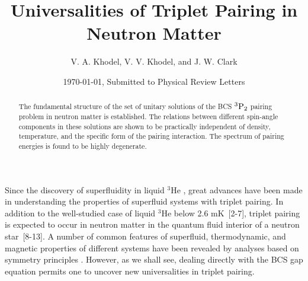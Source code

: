 

\draft
\title{Universalities of Triplet Pairing in Neutron Matter}
\author{V. A. Khodel, V. V. Khodel, and J. W. Clark}
\address{McDonnell Center for the Space Sciences
and Department of Physics,\\
Washington University, St. Louis, MO 63130 USA}
\date{\today , Submitted to Physical Review Letters}
\maketitle
\begin{abstract}

The fundamental structure of the set of unitary solutions of
the BCS $^3{\rm P}_2$ pairing problem in neutron matter is established.
The relations between different spin-angle components in these 
solutions are shown to be practically independent of density,
temperature, and the specific form of the pairing interaction.
The spectrum of pairing energies is found to be highly degenerate.
\end{abstract}

\vskip 1cm

Since the discovery of superfluidity in liquid $^3$He \cite{osh}, 
great advances have been made in understanding the properties of 
superfluid systems with triplet pairing.  In addition to the well-studied
case of liquid $^3$He below 2.6 mK~[2-7], triplet pairing is 
expected to occur in neutron matter in the quantum fluid interior of
a neutron star~[8-13].  A number of common features of superfluid, 
thermodynamic, and magnetic properties of different systems have been
revealed by analyses based on symmetry principles \cite{wol,vol}. 
However, as we shall see, dealing directly with the BCS gap equation 
permits one to uncover new universalities in  triplet pairing. 

